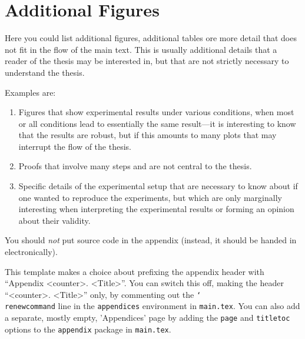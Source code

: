 
\chapter{Additional Figures}
Here you could list additional figures, additional tables ore more detail that does not fit in the flow of the main text.
This is usually additional details that a reader of the thesis may be interested in, but that are not strictly necessary to understand the thesis.

Examples are:
\begin{enumerate}
    \item Figures that show experimental results under various conditions, when most or all conditions lead to essentially the same result---it is interesting to know that the results are robust, but if this amounts to many plots that may interrupt the flow of the thesis.
    \item Proofs that involve many steps and are not central to the thesis.
    \item Specific details of the experimental setup that are necessary to know about if one wanted to reproduce the experiments, but which are only marginally interesting when interpreting the experimental results or forming an opinion about their validity.
\end{enumerate}

You should \emph{not} put source code in the appendix (instead, it should be handed in electronically).

This template makes a choice about prefixing the appendix header with ``Appendix <counter>. <Title>''.
You can switch this off, making the header ``<counter>. <Title>'' only, by commenting out the \texttt{\char`\\renewcommand} line in the \texttt{appendices} environment in \texttt{main.tex}.
You can also add a separate, mostly empty, 'Appendices' page by adding the \texttt{page} and \texttt{titletoc} options to the \texttt{appendix} package in \texttt{main.tex}.